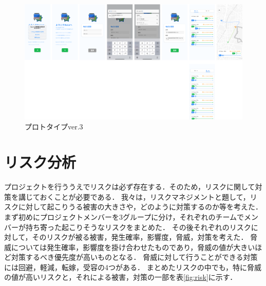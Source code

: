 \begin{figure}[H]
    \centering
    \includegraphics[width=14cm]{images/prototype_v4.png}
    \caption{プロトタイプver.3}
    \label{fig:prototype_v3}
\end{figure}

\section{リスク分析}
プロジェクトを行ううえでリスクは必ず存在する．そのため，リスクに関して対策を講じておくことが必要である．
我々は，リスクマネジメント\cite{risk}と題して，リスクに対して起こりうる被害の大きさや，どのように対策するのか等を考えた．
まず初めにプロジェクトメンバーを3グループに分け，それぞれのチームでメンバーが持ち寄った起こりそうなリスクをまとめた．
その後それぞれのリスクに対して，そのリスクが被る被害，発生確率，影響度，脅威，対策を考えた．
脅威については発生確率，影響度を掛け合わせたものであり，脅威の値が大きいほど対策するべき優先度が高いものとなる．
脅威に対して行うことができる対策には回避，軽減，転嫁，受容の4つがある．
まとめたリスクの中でも，特に脅威の値が高いリスクと，それによる被害，対策の一部を表\ref{fig:risk}に示す．

